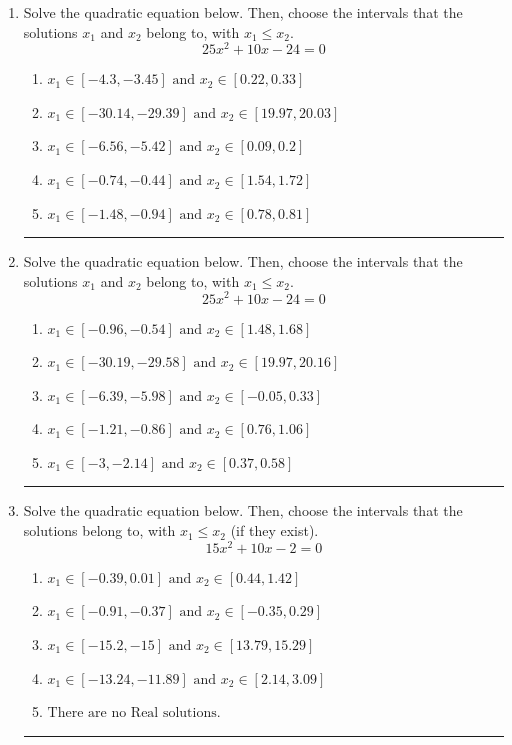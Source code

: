 \documentclass[14pt]{extbook}
\newcommand{\litem}[1]{\item#1\hspace*{-1cm}\rule{\textwidth}{0.4pt}}
\begin{document}
\begin{enumerate}
{\begin{enumerate}[label=\Alph*.]
\end{enumerate} }
\litem{
Solve the quadratic equation below. Then, choose the intervals that the solutions $x_1$ and $x_2$ belong to, with $x_1 \leq x_2$.\[ 25x^{2} +10 x -24 = 0 \]\begin{enumerate}[label=\Alph*.]
\item \( x_1 \in [-4.3, -3.45] \text{ and } x_2 \in [0.22, 0.33] \)
\item \( x_1 \in [-30.14, -29.39] \text{ and } x_2 \in [19.97, 20.03] \)
\item \( x_1 \in [-6.56, -5.42] \text{ and } x_2 \in [0.09, 0.2] \)
\item \( x_1 \in [-0.74, -0.44] \text{ and } x_2 \in [1.54, 1.72] \)
\item \( x_1 \in [-1.48, -0.94] \text{ and } x_2 \in [0.78, 0.81] \)

\end{enumerate} }
\litem{
Solve the quadratic equation below. Then, choose the intervals that the solutions $x_1$ and $x_2$ belong to, with $x_1 \leq x_2$.\[ 25x^{2} +10 x -24 = 0 \]\begin{enumerate}[label=\Alph*.]
\item \( x_1 \in [-0.96, -0.54] \text{ and } x_2 \in [1.48, 1.68] \)
\item \( x_1 \in [-30.19, -29.58] \text{ and } x_2 \in [19.97, 20.16] \)
\item \( x_1 \in [-6.39, -5.98] \text{ and } x_2 \in [-0.05, 0.33] \)
\item \( x_1 \in [-1.21, -0.86] \text{ and } x_2 \in [0.76, 1.06] \)
\item \( x_1 \in [-3, -2.14] \text{ and } x_2 \in [0.37, 0.58] \)

\end{enumerate} }
\litem{
Solve the quadratic equation below. Then, choose the intervals that the solutions belong to, with $x_1 \leq x_2$ (if they exist).\[ 15x^{2} +10 x -2 = 0 \]\begin{enumerate}[label=\Alph*.]
\item \( x_1 \in [-0.39, 0.01] \text{ and } x_2 \in [0.44, 1.42] \)
\item \( x_1 \in [-0.91, -0.37] \text{ and } x_2 \in [-0.35, 0.29] \)
\item \( x_1 \in [-15.2, -15] \text{ and } x_2 \in [13.79, 15.29] \)
\item \( x_1 \in [-13.24, -11.89] \text{ and } x_2 \in [2.14, 3.09] \)
\item \( \text{There are no Real solutions.} \)

\end{enumerate} }
\end{enumerate}
\end{document}
